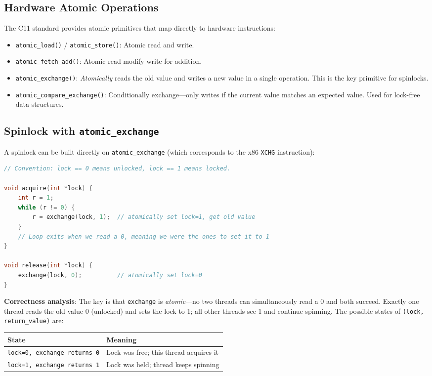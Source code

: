 \documentclass[11pt]{article}
\begin{document}
\subsection{Hardware Atomic Operations}

The C11 standard provides atomic primitives that map directly to hardware instructions:
\begin{itemize}
    \item \texttt{atomic\_load()} / \texttt{atomic\_store()}: Atomic read and write.
    \item \texttt{atomic\_fetch\_add()}: Atomic read-modify-write for addition.
    \item \texttt{atomic\_exchange()}: \emph{Atomically} reads the old value and writes a new value in a single operation. This is the key primitive for spinlocks.
    \item \texttt{atomic\_compare\_exchange()}: Conditionally exchange---only writes if the current value matches an expected value. Used for lock-free data structures.
\end{itemize}

\subsection{Spinlock with \texttt{atomic\_exchange}}

A spinlock can be built directly on \texttt{atomic\_exchange} (which corresponds to the x86 \texttt{XCHG} instruction):

\begin{lstlisting}[language=C, caption={Spinlock using atomic exchange}]
// Convention: lock == 0 means unlocked, lock == 1 means locked.

void acquire(int *lock) {
    int r = 1;
    while (r != 0) {
        r = exchange(lock, 1);  // atomically set lock=1, get old value
    }
    // Loop exits when we read a 0, meaning we were the ones to set it to 1
}

void release(int *lock) {
    exchange(lock, 0);          // atomically set lock=0
}
\end{lstlisting}

\textbf{Correctness analysis}: The key is that \texttt{exchange} is \emph{atomic}---no two threads can simultaneously read a 0 and both succeed. Exactly one thread reads the old value 0 (unlocked) and sets the lock to 1; all other threads see 1 and continue spinning. The possible states of \texttt{(lock, return\_value)} are:

\begin{center}
\begin{tabular}{ll}
\toprule
\textbf{State} & \textbf{Meaning} \\
\midrule
\texttt{lock=0, exchange returns 0} & Lock was free; this thread acquires it \\
\texttt{lock=1, exchange returns 1} & Lock was held; thread keeps spinning \\
\bottomrule
\end{tabular}
\end{center}
\end{document}
